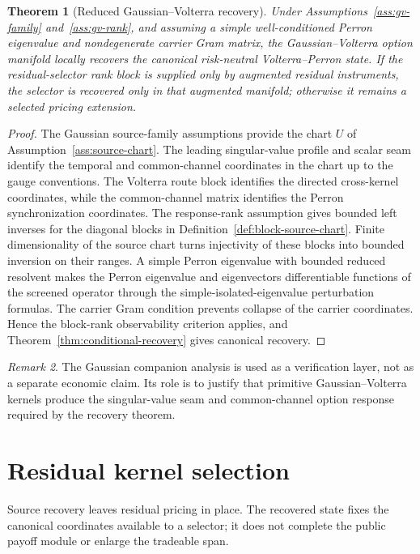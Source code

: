 \documentclass[11pt,a4paper]{amsart}
\theoremstyle{plain}
\newtheorem{theorem}{Theorem}[section]
\theoremstyle{definition}
\theoremstyle{remark}
\newtheorem{remark}[theorem]{Remark}
\begin{document}
\begin{theorem}[Reduced Gaussian--Volterra recovery]\label{thm:gv-recovery}
Under Assumptions~\ref{ass:gv-family} and~\ref{ass:gv-rank}, and assuming a simple
well-conditioned Perron eigenvalue and nondegenerate carrier Gram matrix, the Gaussian--Volterra
option manifold locally recovers the canonical risk-neutral Volterra--Perron state.  If the
residual-selector rank block is supplied only by augmented residual instruments, the selector is
recovered only in that augmented manifold; otherwise it remains a selected pricing extension.
\end{theorem}

\begin{proof}
The Gaussian source-family assumptions provide the chart \(U\) of
Assumption~\ref{ass:source-chart}.  The leading singular-value profile and scalar seam identify
the temporal and common-channel coordinates in the chart up to the gauge conventions.  The
Volterra route block identifies the directed cross-kernel coordinates, while the common-channel
matrix identifies the Perron synchronization coordinates.  The response-rank assumption gives
bounded left inverses for the diagonal blocks in Definition~\ref{def:block-source-chart}.
Finite dimensionality of the source chart turns injectivity of these blocks into bounded
inversion on their ranges.  A simple Perron eigenvalue with bounded reduced resolvent makes the
Perron eigenvalue and eigenvectors differentiable functions of the screened operator through the
simple-isolated-eigenvalue perturbation formulas.  The carrier Gram condition prevents collapse of
the carrier coordinates.
Hence the block-rank observability criterion applies, and
Theorem~\ref{thm:conditional-recovery} gives canonical recovery.
\end{proof}

\begin{remark}
The Gaussian companion analysis is used as a verification layer, not as a separate economic claim.
Its role is to justify that primitive Gaussian--Volterra kernels produce the singular-value seam
and common-channel option response required by the recovery theorem.
\end{remark}

\section{Residual kernel selection}\label{sec:residual}

Source recovery leaves residual pricing in place.  The recovered state fixes the canonical
coordinates available to a selector; it does not complete the public payoff module or enlarge the
tradeable span.
\end{document}
